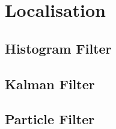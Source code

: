 \section{Localisation}
\lipsum[7] %

\subsection{Histogram Filter}
\lipsum[7] %

\subsection{Kalman Filter}
\lipsum[7] %

\subsection{Particle Filter}
\lipsum[7] %
